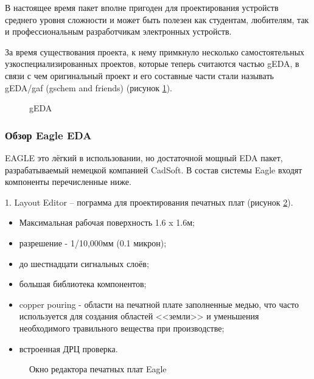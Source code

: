 \begin{par}
В настоящее время пакет вполне пригоден для проектирования устройств среднего уровня
сложности и может быть полезен как студентам, любителям, так и профессиональным
разработчикам электронных устройств.
\end{par}


\begin{par}
За время существования проекта, к нему примкнуло несколько самостоятельных
узкоспециализированных проектов, которые теперь считаются частью gEDA, в
связи с чем оригинальный проект и его составные части стали называть
gEDA/gaf (gschem and friends) (рисунок \ref{img:geda}).
\begin{figure}[ht]
	\caption{gEDA}
	\label{img:geda}
\end{figure}
\end{par}

\subsubsection{Обзор Eagle EDA}
EAGLE это лёгкий в использовании, но достаточной мощный EDA пакет, разрабатываемый немецкой компанией CadSoft.
В состав системы Eagle входят компоненты перечисленные ниже.

\begin{par}
	1. Layout Editor -- пограмма для проектирования печатных плат (рисунок \ref{img:eagle_brd}). 
		\begin{itemize}
			\item{}Максимальная рабочая поверхность 1.6 x 1.6м;
			\item{}разрешение - 1/10,000мм (0.1 микрон);
			\item{}до шестнадцати сигнальных слоёв;
			\item{}большая библиотека компонентов;
			\item{}copper pouring - области на печатной плате заполненные  медью, что часто используется для создания областей <<земли>> и уменьшения необходимого травильного вещества при производстве;
			\item{}встроенная ДРЦ проверка.
		\end{itemize}
        \begin{figure}[ht]
            \caption{Окно редактора печатных плат Eagle}
            \label{img:eagle_brd}
        \end{figure}
\end{par}
	
